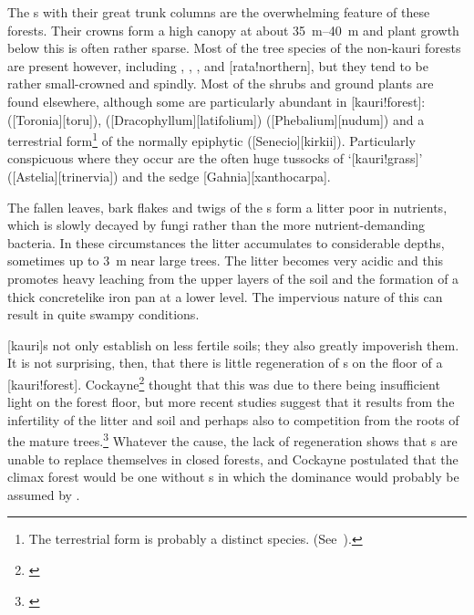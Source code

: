 The s with their great trunk columns are the overwhelming feature of these forests.
Their crowns form a high canopy at about \SIrange{35}{40}{\metre} and plant growth below this is often rather sparse.
Most of the tree species of the non-kauri forests are present however, including , , ,  and [rata!northern], but they tend to be rather small-crowned and spindly.
Most of the shrubs and ground plants are found elsewhere, although some are particularly abundant in [kauri!forest]:  ([Toronia][toru]),  ([Dracophyllum][latifolium])  ([Phebalium][nudum]) and a terrestrial form\footnote{The terrestrial form is probably a distinct species. (See~\cite{eagle1982trees}).} of the normally epiphytic  ([Senecio][kirkii]).
Particularly conspicuous where they occur are the often huge tussocks of `[kauri!grass]' ([Astelia][trinervia]) and the sedge [Gahnia][xanthocarpa].

The fallen leaves, bark flakes and twigs of the s form a litter poor in nutrients, which is slowly decayed by fungi rather than the more nutrient-demanding bacteria.
In these circumstances the litter accumulates to considerable depths, sometimes up to \SI{3}{\metre} near large trees.
The litter becomes very acidic and this promotes heavy leaching from the upper layers of the soil and the formation of a thick concretelike iron pan at a lower level.
The impervious nature of this can result in quite swampy conditions.

[kauri]s not only establish on less fertile soils; they also greatly impoverish them.
It is not surprising, then, that there is little regeneration of s on the floor of a [kauri!forest].
Cockayne\footnote{\cite{cockayne1928vegetation}} thought that this was due to there being insufficient light on the forest floor, but more recent studies suggest that it results from the infertility of the litter and soil and perhaps also to competition from the roots of the mature trees.\footnote{\cite{bieleski1959factors}}
Whatever the cause, the lack of regeneration shows that s are unable to replace themselves in closed forests, and Cockayne postulated that the climax forest would be one without s in which the dominance would probably be assumed by .


